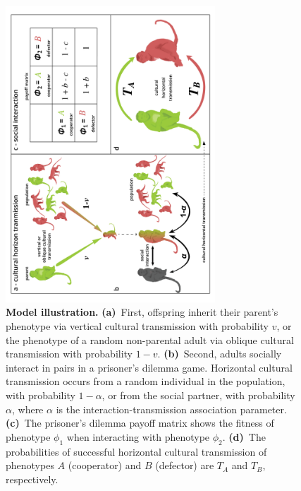 \documentclass[12pt]{extarticle}
\begin{document}
\begin{figure}[pt]
  \centering
  \includegraphics[width=0.7\textwidth]{../PRSB_figures/fig_1.pdf}
  \caption{\textbf{Model illustration.} 
  \textbf{(a)}~First, offspring inherit their parent's phenotype via vertical cultural transmission with probability $v$, or the phenotype of a random non-parental adult via oblique cultural transmission with probability $1-v$.
  \textbf{(b)}~Second, adults socially interact in pairs in a prisoner's dilemma game. Horizontal cultural transmission occurs from a random individual in the population, with probability $1-\alpha$, or from the social partner, with probability $\alpha$, where $\alpha$ is the interaction-transmission association parameter.
  \textbf{(c)}~The prisoner's dilemma payoff matrix shows the fitness of phenotype $\phi_1$ when interacting with phenotype $\phi_2$.
    \textbf{(d)}~The probabilities of successful horizontal cultural transmission of phenotypes $A$ (cooperator) and $B$ (defector) are $T_A$ and $T_B$, respectively.
    }
  \label{fig:illustration}
\end{figure}
\end{document}
